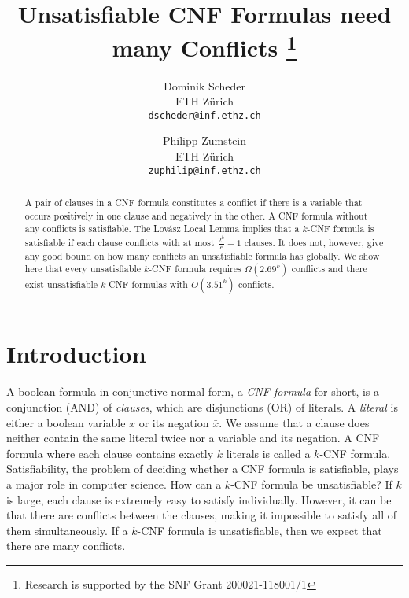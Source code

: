 \documentclass[a4paper, 11pt]{article}
\title{Unsatisfiable CNF Formulas need many Conflicts
\thanks{Research is  supported by the SNF Grant 200021-118001/1}
}
\author{Dominik Scheder\\ 
  ETH Z\"urich\\
  \texttt{dscheder@inf.ethz.ch} \and
  Philipp Zumstein\\
  ETH Z\"urich\\
  \texttt{zuphilip@inf.ethz.ch}}
\begin{document}
\maketitle

\begin{abstract} A pair of clauses in a CNF formula constitutes a
  conflict if there is a variable that occurs positively in one clause
  and negatively in the other. A CNF formula without any conflicts is
  satisfiable. The Lov\'asz Local Lemma implies that a $k$-CNF formula
is satisfiable if each clause conflicts with at most
  $\frac{2^k}{e}-1$ clauses. It does not, however, give any good bound
  on how many conflicts an unsatisfiable formula has globally. We show
  here that every unsatisfiable $k$-CNF formula requires
  $\Omega(2.69^k)$ conflicts and there exist unsatisfiable $k$-CNF
  formulas with $O(3.51^k)$ conflicts.
\end{abstract}

\section{Introduction}

A boolean formula in conjunctive normal form, a {\em CNF formula} for
short, is a conjunction (AND) of {\em clauses}, which are disjunctions
(OR) of literals. A {\em literal} is either a boolean variable $x$ or
its negation $\bar{x}$.  We assume that a clause does neither contain
the same literal twice nor a variable and its negation. A CNF formula
where each clause contains exactly $k$ literals is called a $k$-CNF
formula.  Satisfiability, the problem of deciding whether a CNF
formula is satisfiable, plays a major role in computer science.  How
can a $k$-CNF formula be unsatisfiable?  If $k$ is large, each clause
is extremely easy to satisfy individually.  However, it can be that
there are conflicts between the clauses, making it impossible to
satisfy all of them simultaneously.  If a $k$-CNF formula is
unsatisfiable,
then we expect that there are many conflicts.\\
\end{document}
